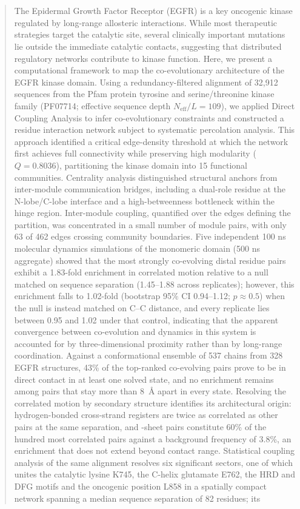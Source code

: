 \documentclass[utf8]{FrontiersinHarvard}
\begin{document}
\begin{abstract}
\section{}
The Epidermal Growth Factor Receptor (EGFR) is a key oncogenic kinase regulated by long-range allosteric interactions. While most therapeutic strategies target the catalytic site, several clinically important mutations lie outside the immediate catalytic contacts, suggesting that distributed regulatory networks contribute to kinase function. Here, we present a computational framework to map the co-evolutionary architecture of the EGFR kinase domain. Using a redundancy-filtered alignment of 32,912 sequences from the Pfam protein tyrosine and serine/threonine kinase family (PF07714; effective sequence depth $N_{\mathrm{eff}}/L = 109$), we applied Direct Coupling Analysis to infer co-evolutionary constraints and constructed a residue interaction network subject to systematic percolation analysis. This approach identified a critical edge-density threshold at which the network first achieves full connectivity while preserving high modularity ($Q = 0.8036$), partitioning the kinase domain into 15 functional communities. Centrality analysis distinguished structural anchors from inter-module communication bridges, including a dual-role residue at the N-lobe/C-lobe interface and a high-betweenness bottleneck within the hinge region. Inter-module coupling, quantified over the edges defining the partition, was concentrated in a small number of module pairs, with only 63 of 462 edges crossing community boundaries. Five independent 100 ns molecular dynamics simulations of the monomeric domain (500 ns aggregate) showed that the most strongly co-evolving distal residue pairs exhibit a 1.83-fold enrichment in correlated motion relative to a null matched on sequence separation (1.45--1.88 across replicates); however, this enrichment falls to 1.02-fold (bootstrap 95\% CI 0.94--1.12; $p \approx 0.5$) when the null is instead matched on C\textalpha{}--C\textalpha{} distance, and every replicate lies between 0.95 and 1.02 under that control, indicating that the apparent convergence between co-evolution and dynamics in this system is accounted for by three-dimensional proximity rather than by long-range coordination. Against a conformational ensemble of 537 chains from 328 EGFR structures, 43\% of the top-ranked co-evolving pairs prove to be in direct contact in at least one solved state, and no enrichment remains among pairs that stay more than 8~\AA{} apart in every state. Resolving the correlated motion by secondary structure identifies its architectural origin: hydrogen-bonded cross-strand \textbeta{} registers are twice as correlated as other pairs at the same separation, and \textbeta{}-sheet pairs constitute 60\% of the hundred most correlated pairs against a background frequency of 3.8\%, an enrichment that does not extend beyond contact range. Statistical coupling analysis of the same alignment resolves six significant sectors, one of which unites the catalytic lysine K745, the \textalpha{}C-helix glutamate E762, the HRD and DFG motifs and the oncogenic position L858 in a spatially compact network spanning a median sequence separation of 82 residues; its 
\end{abstract}
\end{document}
